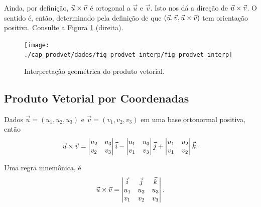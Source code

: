 Ainda, por definição, $\vec{u}\times\vec{v}$ é ortogonal a $\vec{u}$ e $\vec{v}$. Isto nos dá a direção de $\vec{u}\times\vec{v}$. O sentido é, então, determinado pela definição de que $(\vec{u},\vec{v},\vec{u}\times\vec{v})$ tem orientação positiva. Consulte a Figura \ref{fig:prodvet_interp} (direita).

\begin{figure}[H]
  \centering
  \texttt{[image: ./cap\_prodvet/dados/fig\_prodvet\_interp/fig\_prodvet\_interp]}
  \caption{Interpretação geométrica do produto vetorial.}
  \label{fig:prodvet_interp}
\end{figure}

\subsection{Produto Vetorial por Coordenadas}\label{cap_prodvet_sec_coord}

Dados $\vec{u} = (u_1,u_2,u_3)$ e $\vec{v} = (v_1,v_2,v_3)$ em uma base ortonormal positiva, então
\begin{equation}
  \vec{u}\times\vec{v} =
  \begin{vmatrix}
    u_2 & u_3\\
    v_2 & v_3
  \end{vmatrix}\vec{i} -
  \begin{vmatrix}
    u_1 & u_3\\
    v_1 & v_3
  \end{vmatrix}\vec{j} +
  \begin{vmatrix}
    u_1 & u_2 \\
    v_1 & v_2
  \end{vmatrix}\vec{k}.
\end{equation}

\begin{obs}
  Uma regra mnemônica, é
  \begin{equation}
    \vec{u}\times\vec{v} =
    \begin{vmatrix}
      \vec{i} & \vec{j} & \vec{k} \\
      u_1 & u_2 & u_3 \\
      v_1 & v_2 & v_3
    \end{vmatrix}.
  \end{equation}
\end{obs}

